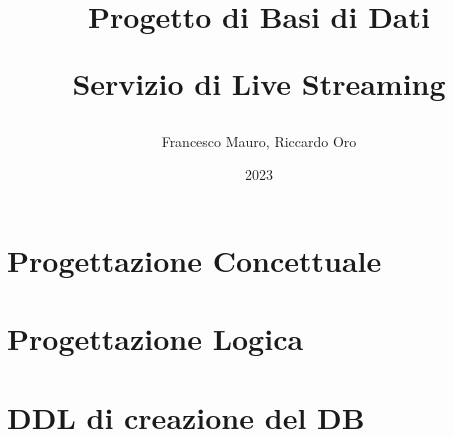 \documentclass[letterpaper]{report}
\title{ Progetto di Basi di Dati \newline \begin{center}
  \textbf{Servizio di Live Streaming}
\end{center}}
\author{Francesco Mauro, Riccardo Oro}
\date{2023}
\begin{document}
\maketitle
\tableofcontents

\chapter{Progettazione Concettuale}




\chapter{Progettazione Logica}



\chapter{DDL di creazione del DB}

\end{document}
